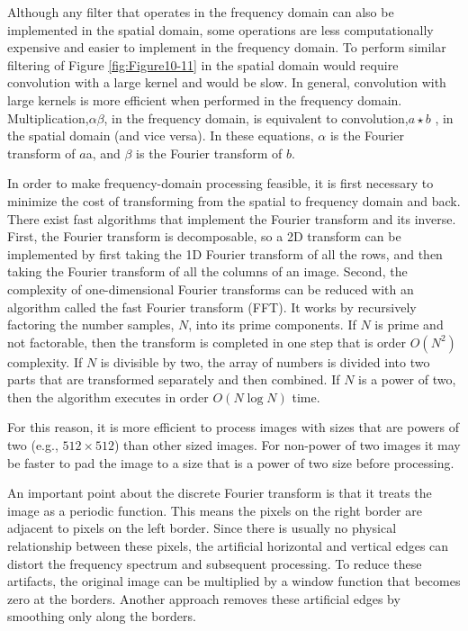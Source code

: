 Although any filter that operates in the frequency domain can also be implemented in the spatial domain, some operations are less computationally expensive and easier to implement in the frequency domain. To perform similar filtering of Figure \ref{fig:Figure10-11} in the spatial domain would require convolution with a large kernel and would be slow. In general, convolution with large kernels is more efficient when performed in the frequency domain. Multiplication,$\alpha \beta$, in the frequency domain, is equivalent to convolution,$a \star b$ , in the spatial domain (and vice versa). In these equations, $\alpha$ is the Fourier transform of $a$a, and $\beta$ is the Fourier transform of $b$.

In order to make frequency-domain processing feasible, it is first necessary to minimize the cost of transforming from the spatial to frequency domain and back. There exist fast algorithms that implement the Fourier transform and its inverse. First, the Fourier transform is decomposable, so a 2D transform can be implemented by first taking the 1D Fourier transform of all the rows, and then taking the Fourier transform of all the columns of an image. Second, the complexity of one-dimensional Fourier transforms can be reduced with an algorithm called the fast Fourier transform (FFT). It works by recursively factoring the number samples, $N$, into its prime components. If $N$ is prime and not factorable, then the transform is completed in one step that is order $O(N^2)$ complexity. If $N$ is divisible by two, the array of numbers is divided into two parts that are transformed separately and then combined. If $N$ is a power of two, then the algorithm executes in order $O(N \log N)$ time.

For this reason, it is more efficient to process images with sizes that are powers of two (e.g., $512 \times 512$) than other sized images. For non-power of two images it may be faster to pad the image to a size that is a power of two size before processing.

An important point about the discrete Fourier transform is that it treats the image as a periodic function. This means the pixels on the right border are adjacent to pixels on the left border. Since there is usually no physical relationship between these pixels, the artificial horizontal and vertical edges can distort the frequency spectrum and subsequent processing. To reduce these artifacts, the original image can be multiplied by a window function that becomes zero at the borders. Another approach removes these artificial edges by smoothing only along the borders.


